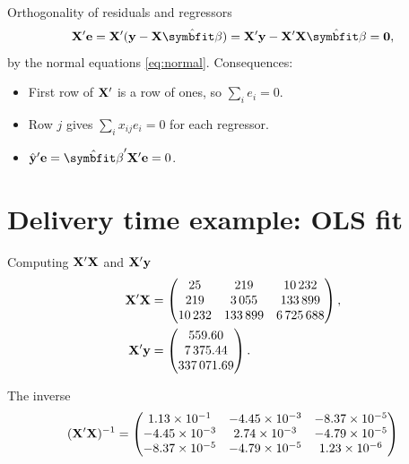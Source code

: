 \begin{frame}{Orthogonality of residuals and regressors}
    \begin{align}
        \bX'\be = \bX'(\by-\bX\hat{\bbeta}) = \bX'\by - \bX'\bX\hat{\bbeta} = \bzero, \label{eq:orth}
    \end{align}
    by the normal equations \eqref{eq:normal}. Consequences:
    \begin{itemize}
        \item First row of $\mathbf{X}'$ is a row of ones, so $\sum_i e_i = 0$.
        \item Row $j$ gives $\sum_i x_{ij}e_i = 0$ for each regressor.
        \item $\hat{\by}'\be = \hat{\bbeta}'\bX'\be = 0$.
    \end{itemize}
\end{frame}


\section{Delivery time example: OLS fit}


\begin{frame}{Computing $\mathbf{X}'\mathbf{X}$ and $\mathbf{X}'\mathbf{y}$}
    \begin{align*}
        \mathbf{X}'\mathbf{X} &= \begin{pmatrix} 25 & 219 & 10\,232 \\ 219 & 3\,055 & 133\,899 \\ 10\,232 & 133\,899 & 6\,725\,688 \end{pmatrix}, \\
        \mathbf{X}'\mathbf{y} &= \begin{pmatrix} 559.60 \\ 7\,375.44 \\ 337\,071.69 \end{pmatrix}.
    \end{align*}
\end{frame}


\begin{frame}{The inverse}
    \small
    \setlength{\arraycolsep}{4pt}
    \[
    (\mathbf{X}'\mathbf{X})^{-1} =
    \begin{pmatrix}
        1.13\times10^{-1} & -4.45\times10^{-3} & -8.37\times10^{-5} \\
        -4.45\times10^{-3} & 2.74\times10^{-3} & -4.79\times10^{-5} \\
        -8.37\times10^{-5} & -4.79\times10^{-5} & 1.23\times10^{-6}
    \end{pmatrix}
    \]
\end{frame}


